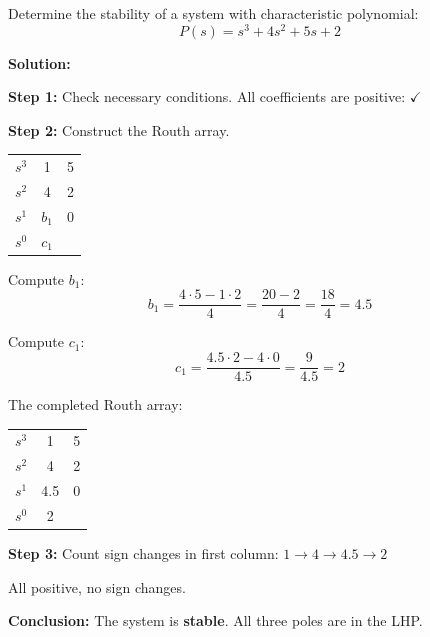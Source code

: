 \begin{examplebox}
Determine the stability of a system with characteristic polynomial:
\begin{equation*}
P(s) = s^3 + 4s^2 + 5s + 2
\end{equation*}

\textbf{Solution:}

\textbf{Step 1:} Check necessary conditions. All coefficients are positive: $\checkmark$

\textbf{Step 2:} Construct the Routh array.

\begin{center}
\begin{tabular}{c|cc}
\toprule
$s^3$ & 1 & 5 \\
$s^2$ & 4 & 2 \\
$s^1$ & $b_1$ & 0 \\
$s^0$ & $c_1$ & \\
\bottomrule
\end{tabular}
\end{center}

Compute $b_1$:
\begin{equation*}
b_1 = \frac{4 \cdot 5 - 1 \cdot 2}{4} = \frac{20 - 2}{4} = \frac{18}{4} = 4.5
\end{equation*}

Compute $c_1$:
\begin{equation*}
c_1 = \frac{4.5 \cdot 2 - 4 \cdot 0}{4.5} = \frac{9}{4.5} = 2
\end{equation*}

The completed Routh array:
\begin{center}
\begin{tabular}{c|cc}
\toprule
$s^3$ & 1 & 5 \\
$s^2$ & 4 & 2 \\
$s^1$ & 4.5 & 0 \\
$s^0$ & 2 & \\
\bottomrule
\end{tabular}
\end{center}

\textbf{Step 3:} Count sign changes in first column: $1 \to 4 \to 4.5 \to 2$

All positive, no sign changes.

\textbf{Conclusion:} The system is \textbf{stable}. All three poles are in the LHP.
\end{examplebox}

\vspace{1em}

